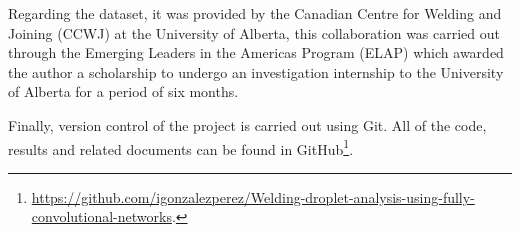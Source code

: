 Regarding the dataset, it was provided by the Canadian Centre for Welding and Joining (CCWJ) at the University of Alberta, this collaboration was carried out through the Emerging Leaders in the Americas Program (ELAP) which awarded the author a scholarship to undergo an investigation internship to the University of Alberta for a period of six months.

Finally, version control of the project is carried out using Git. All of the code, results and related documents can be found in GitHub\footnote{\url{https://github.com/igonzalezperez/Welding-droplet-analysis-using-fully-convolutional-networks}.}.